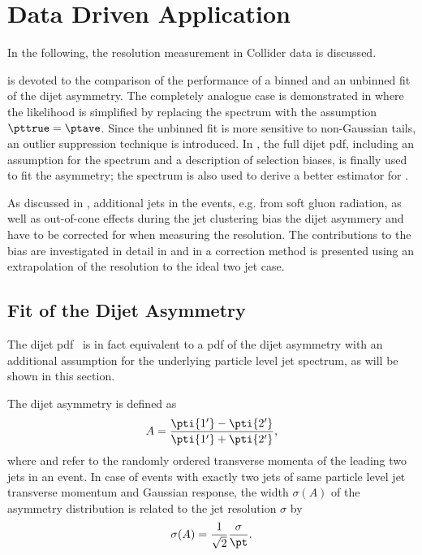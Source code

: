 \section{Data Driven Application}

In the following, the resolution measurement in Collider data is
discussed.

 is devoted to the comparison of the performance of a
binned and an unbinned fit of the dijet asymmetry.
The completely analogue case is demonstrated in
 where the likelihood is simplified by replacing the spectrum
with the assumption \mbox{$\pttrue = \ptave$}.
Since the unbinned fit is more sensitive to non-Gaussian tails, an outlier
suppression technique is introduced.
In , the full dijet pdf, including an assumption for the
spectrum and a description of selection biases, is finally used to fit the asymmetry;
the spectrum is also used to derive a better estimator for \ptgen.

As discussed in , additional jets in the events, e.g. from soft gluon radiation, as
well as out-of-cone effects during the jet clustering bias the dijet asymmery and have to be
corrected for when measuring the resolution.
The contributions to the bias are investigated in detail in  and
in  a correction method is presented using an extrapolation of
the resolution to the ideal two jet case.



\subsection{Fit of the Dijet Asymmetry}\label{sec:ResFit:Asym}

The dijet pdf~ is in fact equivalent to a pdf of the dijet
asymmetry with an additional assumption for the underlying particle
level jet spectrum, as will be shown in this section.

The dijet asymmetry is defined as
\begin{equation}\label{eq:ResFit:Asymmetry}
  A = \frac{\pti{1'}-\pti{2'}}{\pti{1'}+\pti{2'}},
\end{equation}
where  and  refer to the randomly ordered transverse momenta of the
leading two jets in an event.
In case of events with exactly two jets of same particle level jet
transverse momentum \pt and Gaussian response, the width $\sigma(A)$ of the asymmetry distribution is
related to the jet \pt resolution $\sigma$ by
\begin{equation}
  \label{eq:ResFit:ResFromAsym}
  \sigma(A) = \frac{1}{\sqrt{2}}\frac{\sigma}{\pt}.
\end{equation}


